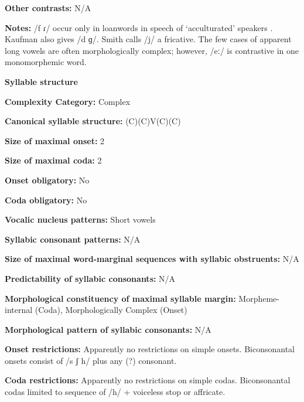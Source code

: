 \textbf{Other contrasts:} N/A



\textbf{Notes:} /f ɾ/ occur only in loanwords in speech of ‘acculturated’ speakers \citep[13]{Kaufman1971}. Kaufman also gives /d ɡ/. Smith calls /j/ a fricative. The few cases of apparent long vowels are often morphologically complex; however, /eː/ is contrastive in one monomorphemic word.



\textbf{Syllable structure}



\textbf{Complexity Category:} Complex



\textbf{Canonical syllable structure:} (C)(C)V(C)(C) \citep[9-15]{Kaufman1971}



\textbf{Size of maximal onset:} 2



\textbf{Size of maximal coda:} 2



\textbf{Onset obligatory:} No



\textbf{Coda obligatory:} No



\textbf{Vocalic nucleus patterns:} Short vowels



\textbf{Syllabic consonant patterns:} N/A



\textbf{Size of maximal word{}-marginal sequences with syllabic obstruents:} N/A



\textbf{Predictability of syllabic consonants:} N/A



\textbf{Morphological constituency of maximal syllable margin:} Morpheme-internal (Coda), Morphologically Complex (Onset)



\textbf{Morphological pattern of syllabic consonants:} N/A



\textbf{Onset restrictions:} Apparently no restrictions on simple onsets. Biconsonantal onsets consist of /s ʃ h/ plus any (?) consonant.



\textbf{Coda restrictions:} Apparently no restrictions on simple codas. Biconsonantal codas limited to sequence of /h/ + voiceless stop or affricate.



